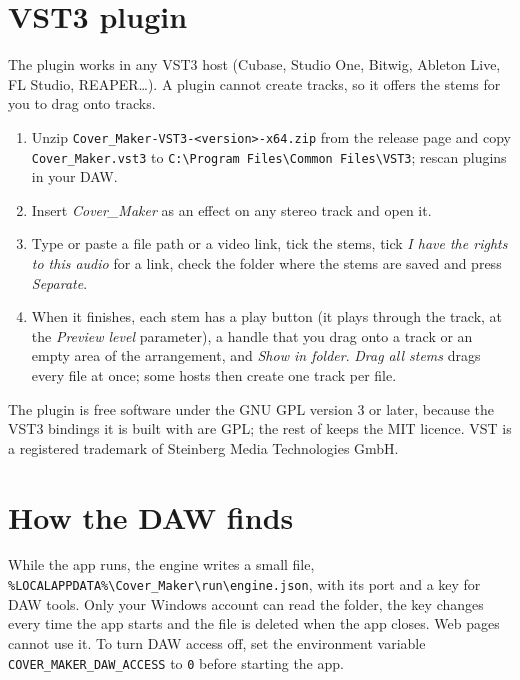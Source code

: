 \documentclass{covermaker}
\begin{document}
\section{VST3 plugin}
The plugin works in any VST3 host (Cubase, Studio One, Bitwig, Ableton Live,
FL Studio, REAPER\ldots). A plugin cannot create tracks, so it offers the stems
for you to drag onto tracks.
\begin{enumerate}
  \item Unzip \texttt{Cover\_Maker-VST3-<version>-x64.zip} from the release
        page and copy \texttt{Cover\_Maker.vst3} to
        \texttt{C:\textbackslash Program Files\textbackslash Common Files\textbackslash VST3};
        rescan plugins in your DAW.
  \item Insert \emph{Cover\_Maker} as an effect on any stereo track and open it.
  \item Type or paste a file path or a video link, tick the stems, tick
        \emph{I have the rights to this audio} for a link, check the folder
        where the stems are saved and press \emph{Separate}.
  \item When it finishes, each stem has a play button (it plays through the
        track, at the \emph{Preview level} parameter), a handle that you drag
        onto a track or an empty area of the arrangement, and \emph{Show in
        folder}. \emph{Drag all stems} drags every file at once; some hosts
        then create one track per file.
\end{enumerate}
The plugin is free software under the GNU GPL version 3 or later, because the
VST3 bindings it is built with are GPL; the rest of \CM{} keeps the MIT
licence. VST is a registered trademark of Steinberg Media Technologies GmbH.

\section{How the DAW finds \CM{}}
While the app runs, the engine writes a small file,
\texttt{\%LOCALAPPDATA\%\textbackslash Cover\_Maker\textbackslash run\textbackslash engine.json},
with its port and a key for DAW tools. Only your Windows account can read the
folder, the key changes every time the app starts and the file is deleted when
the app closes. Web pages cannot use it. To turn DAW access off, set the
environment variable \texttt{COVER\_MAKER\_DAW\_ACCESS} to \texttt{0} before
starting the app.
\end{document}
